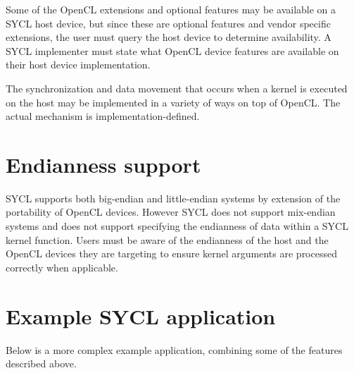 Some of the OpenCL extensions and optional features may be available on a SYCL
host device, but since these are optional features and vendor specific
extensions, the user must query the host device to determine availability. A
SYCL implementer must state what OpenCL device features are available on
their host device implementation.

The synchronization and data movement that occurs when a kernel is executed on
the host may be implemented in a variety of ways
on top of OpenCL. The actual mechanism is implementation-defined.

\section{Endianness support}

SYCL supports both big-endian and little-endian systems by extension of the portability of OpenCL devices. However SYCL does not support mix-endian systems and does not support specifying the endianness of data within a SYCL kernel function. Users must be aware of the endianness of the host and the OpenCL devices they are targeting to ensure kernel arguments are processed correctly when applicable.

\section{Example SYCL application}

Below is a more complex example application, combining some of the features
described above.





